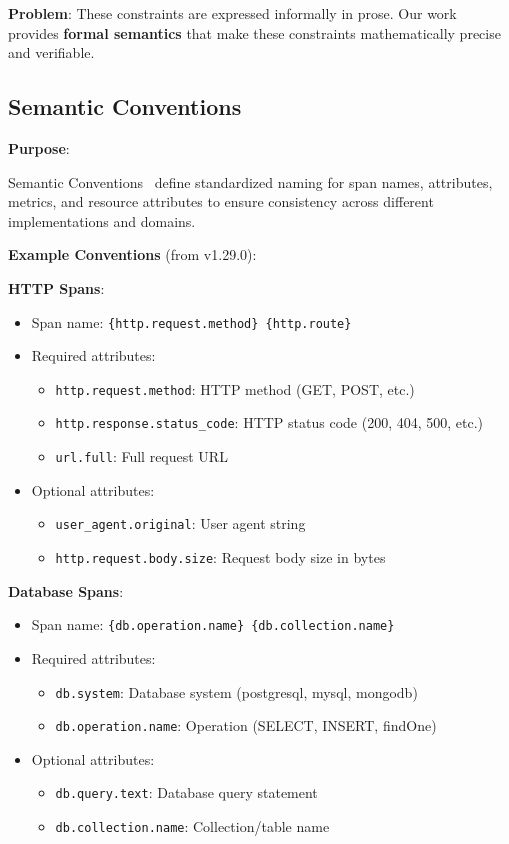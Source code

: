 \textbf{Problem}: These constraints are expressed informally in prose. Our work provides \textbf{formal semantics} that make these constraints mathematically precise and verifiable.

\subsection{Semantic Conventions}
\label{sec:semantic-conventions}

\textbf{Purpose}:

Semantic Conventions~\cite{otel-semconv} define standardized naming for span names, attributes, metrics, and resource attributes to ensure consistency across different implementations and domains.

\textbf{Example Conventions} (from v1.29.0):

\textbf{HTTP Spans}:

\begin{itemize}
\item Span name: \texttt{\{http.request.method\} \{http.route\}}
\item Required attributes:
  \begin{itemize}
  \item \texttt{http.request.method}: HTTP method (GET, POST, etc.)
  \item \texttt{http.response.status\_code}: HTTP status code (200, 404, 500, etc.)
  \item \texttt{url.full}: Full request URL
  \end{itemize}
\item Optional attributes:
  \begin{itemize}
  \item \texttt{user\_agent.original}: User agent string
  \item \texttt{http.request.body.size}: Request body size in bytes
  \end{itemize}
\end{itemize}

\textbf{Database Spans}:

\begin{itemize}
\item Span name: \texttt{\{db.operation.name\} \{db.collection.name\}}
\item Required attributes:
  \begin{itemize}
  \item \texttt{db.system}: Database system (postgresql, mysql, mongodb)
  \item \texttt{db.operation.name}: Operation (SELECT, INSERT, findOne)
  \end{itemize}
\item Optional attributes:
  \begin{itemize}
  \item \texttt{db.query.text}: Database query statement
  \item \texttt{db.collection.name}: Collection/table name
  \end{itemize}
\end{itemize}

